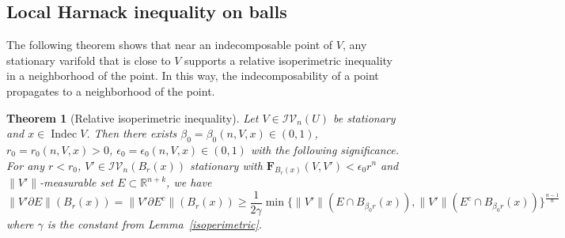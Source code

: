 \documentclass[11pt]{amsart}
\newtheorem{theorem}{Theorem}[section]
\newtheorem{corollary}[theorem]{Corollary}
\theoremstyle{definition}
\newtheorem{definition}[theorem]{Definition}
\newcommand{\HH}{\mathcal{H}}
\newcommand{\R}{\mathbb{R}}
\newcommand{\C}{\mathcal{C}}
\newcommand{\IV}{\mathcal{IV}}
\newcommand{\loc}{\mathrm{loc}}
\DeclareMathOperator{\spt}{spt}
\DeclareMathOperator{\sing}{sing}
\DeclareMathOperator{\reg}{reg}
\DeclareMathOperator{\indec}{Indec}
\begin{document}
    




    

\subsection{Local Harnack inequality on balls}
The following theorem shows that near an indecomposable point of $V$, any stationary varifold that is close to $V$ supports a relative isoperimetric inequality in a neighborhood of the point. In this way, the indecomposability of a point propagates to a neighborhood of the point.
\begin{theorem}[Relative isoperimetric inequality]\label{relative.isoperimetric.varifold}
	    Let $V\in \IV_n(U)$ be stationary and $x\in\indec V$. Then there exists $\beta_0=\beta_0(n,V,x)\in(0,1)$, $r_0=r_0(n,V,x)>0$, $\epsilon_0=\epsilon_0(n,V,x)\in(0,1)$ with the following significance.  For any $r<r_0$, $V'\in \IV_n(B_r(x))$ stationary with $\mathbf{F}_{B_r(x)}(V,V')<\epsilon_0 r^n$ and $\|V'\|$-measurable set $E\subset \R^{n+k}$, we have
	\[\|V'\partial E\|(B_r(x))=\|V'\partial E^c\|(B_r(x))\ge \frac{1}{2\gamma}\min\{\|V'\|( E\cap B_{\beta_0 r}(x)),\|V'\|(E^c\cap B_{\beta_0 r}(x))\}^{\frac{n-1}{n}}\]
	where $\gamma$ is the constant from Lemma~\ref{isoperimetric}.
\end{theorem}
\end{document}
